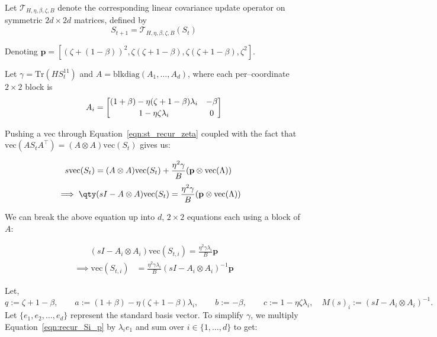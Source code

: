 \documentclass{article}
\renewcommand{\vec}{\text{vec}}
\begin{document}
Let $\mathcal{T}_{H,\eta,\beta,\zeta,B}$ denote the corresponding linear covariance
update operator on symmetric $2d\times 2d$ matrices, defined by
\begin{equation}
\label{eq:TS_zeta}
S_{t+1} = \mathcal{T}_{H,\eta,\beta, \zeta,B}(S_t)
\end{equation}

Denoting $\textbf{p} = [(\zeta + (1-\beta))^2, \zeta(\zeta + 1 - \beta),  \zeta(\zeta + 1 - \beta), \zeta^2]$. 

Let $\gamma = \mathrm{Tr}(H S_t^{11})$ and \(A=\mathrm{blkdiag}(A_1,\ldots,A_d)\), where each per–coordinate \(2\times2\) block is
\begin{equation}
A_i=
\begin{bmatrix}
(1+\beta) - \eta(\zeta +1 - \beta)\lambda_i  & -\beta\\[2pt]
1 - \eta\zeta\lambda_i & 0
\end{bmatrix} \notag
\end{equation}


Pushing a $\vec$ through Equation~\ref{eqn:st_recur_zeta} coupled with the fact that $\vec(AS_tA^\top) = (A \otimes A)\vec(S_t)$ gives us:

\begin{align}
    s \vec(S_t) &= (A \otimes A) \vec(S_t) + \frac{\eta^2 \gamma}{B} (\textbf{p} \otimes \vec(\Lambda))\ \notag
\end{align}
\begin{align}
        \implies \qty(sI - A \otimes A) \vec(S_t) &= \frac{ \eta^2 \gamma}{B} (\textbf{p} \otimes \vec(\Lambda)) \notag
\end{align}

We can break the above equation up into $d$, $2 \times 2$ equations each using a block of $A$:

\begin{align*}
    (sI - A_i \otimes A_i) \vec(S_{t,i}) = \frac{\eta^2 \gamma\lambda_i }{B} \textbf{p}
\end{align*}
\begin{align}
    \implies \vec(S_{t,i}) &= \frac{\eta^2 \gamma\lambda_i }{B} (sI - A_i \otimes A_i)^{-1} \textbf{p}
    \label{eqn:recur_Si_p}
\end{align}



Let,
\[
q := \zeta + 1 - \beta,
\qquad
a := (1+\beta) - \eta(\zeta+1-\beta)\lambda_i,
\qquad
b := -\beta,
\qquad
c := 1 - \eta \zeta \lambda_i,
\quad M(s)_i := (sI - A_i \otimes A_i)^{-1}.
\]
Let $\{e_1, e_2, \dots, e_d\}$ represent the standard basis vector. To simplify $\gamma$, we multiply Equation~\ref{eqn:recur_Si_p} by $\lambda_ie_1$ and sum over $i \in \{1, \dots, d\}$ to get:
\end{document}
